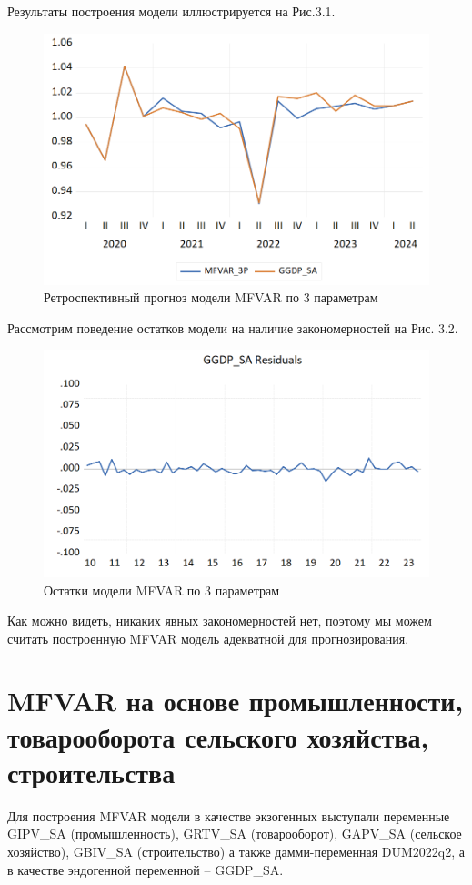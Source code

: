 \documentclass[a4paper, 14pt]{extreport}
\numberwithin{equation}{subsection}
\numberwithin{equation}{section}
\begin{document}
	Результаты построения модели
	иллюстрируется на Рис.3.1.
	
	\begin{figure}[h]
		\centering
		\includegraphics[scale=0.5]{images/img15}
		\caption{Ретроспективный прогноз модели MFVAR по 3 параметрам}
		\label{fig:img15}
	\end{figure}
	
	Рассмотрим поведение остатков модели на наличие закономерностей на Рис. 3.2.
	
	\begin{figure}[h!]
		\centering
		\includegraphics[scale=0.5]{images/img16}
		\caption{Остатки модели MFVAR по 3 параметрам}
		\label{fig:img16}
	\end{figure}
	
	Как можно видеть, никаких явных закономерностей нет, поэтому мы можем считать построенную MFVAR модель адекватной для прогнозирования.
	
	\section{MFVAR на основе промышленности, товарооборота сельского хозяйства, строительства}
	Для построения MFVAR модели в качестве экзогенных выступали
	переменные GIPV\_SA (промышленность), GRTV\_SA (товарооборот), GAPV\_SA (сельское хозяйство), GBIV\_SA (строительство) а также дамми-переменная
	DUM2022q2, а в качестве эндогенной переменной -- GGDP\_SA. 
	
\end{document}
